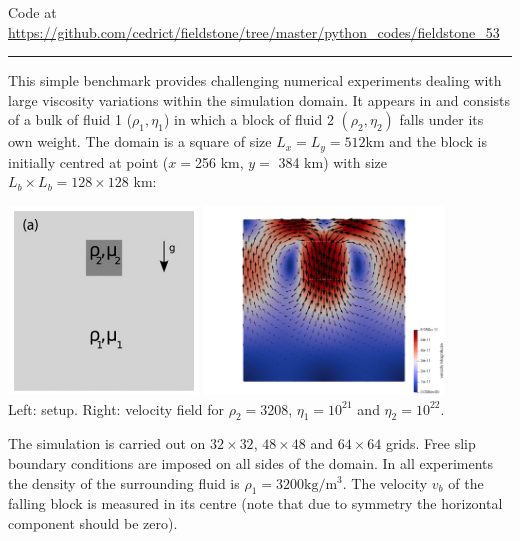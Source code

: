 

\begin{center}
Code at \url{https://github.com/cedrict/fieldstone/tree/master/python_codes/fieldstone_53}
\end{center}

\par\noindent\rule{\textwidth}{0.4pt}

This simple benchmark provides challenging numerical experiments 
dealing with large viscosity variations within the simulation
domain. It appears in \cite{gery10} and consists of a bulk of fluid 1 ($\rho_1,\eta_1$)
in which a block of fluid 2 $(\rho_2,\eta_2)$ falls under its own
weight. The domain is a square of size $L_x=L_y=512$km and the
block is initially centred at point ($x=$256 km, $y=$ 384 km) with size
$L_b\times L_b = 128\times 128$ km:

\begin{center}
\includegraphics[height=5cm]{python_codes/fieldstone_53/images/setup}
\includegraphics[height=5cm]{python_codes/fieldstone_53/images/vel}\\
{\captionfont Left: setup. Right: velocity field for $\rho_2=3208$, $\eta_1=10^{21}$
and $\eta_2=10^{22}$.}
\end{center}

The simulation is carried out on $32\times32$, $48\times48$ and $64\times 64$ grids. Free slip
boundary conditions are imposed on all sides of the domain. 
In all experiments the density of the surrounding fluid is $\rho_1=3200\text{kg}/\text{m}^3$.
The velocity $v_b$ of the falling block is measured in its centre (note that due to symmetry 
the horizontal component should be zero).

